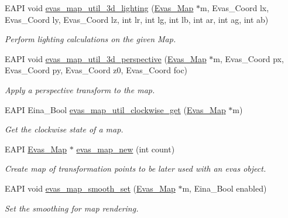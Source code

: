 \begin{DoxyCompactItemize}
EAPI void \hyperlink{Evas_8h_a4dd3a3cf9091afaa87bc042b12a5685d}{evas\_\-map\_\-util\_\-3d\_\-lighting} (\hyperlink{group__Evas__Object__Group__Map_gae94fcea124ae4135e8bb15a014b334dc}{Evas\_\-Map} $\ast$m, Evas\_\-Coord lx, Evas\_\-Coord ly, Evas\_\-Coord lz, int lr, int lg, int lb, int ar, int ag, int ab)
\begin{DoxyCompactList}\small\item\em Perform lighting calculations on the given Map. \item\end{DoxyCompactList}\item 
EAPI void \hyperlink{Evas_8h_a14c467420d169d666865cdb31746728d}{evas\_\-map\_\-util\_\-3d\_\-perspective} (\hyperlink{group__Evas__Object__Group__Map_gae94fcea124ae4135e8bb15a014b334dc}{Evas\_\-Map} $\ast$m, Evas\_\-Coord px, Evas\_\-Coord py, Evas\_\-Coord z0, Evas\_\-Coord foc)
\begin{DoxyCompactList}\small\item\em Apply a perspective transform to the map. \item\end{DoxyCompactList}\item 
EAPI Eina\_\-Bool \hyperlink{Evas_8h_a4e7cd972cac5507838c9827ef04b2607}{evas\_\-map\_\-util\_\-clockwise\_\-get} (\hyperlink{group__Evas__Object__Group__Map_gae94fcea124ae4135e8bb15a014b334dc}{Evas\_\-Map} $\ast$m)
\begin{DoxyCompactList}\small\item\em Get the clockwise state of a map. \item\end{DoxyCompactList}\item 
EAPI \hyperlink{group__Evas__Object__Group__Map_gae94fcea124ae4135e8bb15a014b334dc}{Evas\_\-Map} $\ast$ \hyperlink{Evas_8h_a719acc4f4792236f7031664ec450b399}{evas\_\-map\_\-new} (int count)
\begin{DoxyCompactList}\small\item\em Create map of transformation points to be later used with an evas object. \item\end{DoxyCompactList}\item 
EAPI void \hyperlink{Evas_8h_ae851a2ebf0c272cf0bcb97168b625d23}{evas\_\-map\_\-smooth\_\-set} (\hyperlink{group__Evas__Object__Group__Map_gae94fcea124ae4135e8bb15a014b334dc}{Evas\_\-Map} $\ast$m, Eina\_\-Bool enabled)
\begin{DoxyCompactList}\small\item\em Set the smoothing for map rendering. \item\end{DoxyCompactList}\item 

\end{DoxyCompactItemize}
